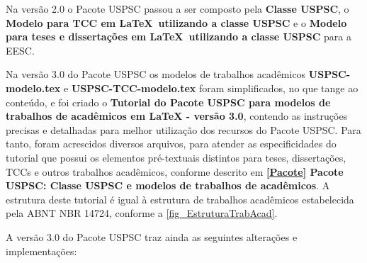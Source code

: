 Na versão 2.0 o Pacote USPSC passou a ser composto pela \textbf{Classe USPSC}, o \textbf{Modelo para TCC em \LaTeX\ utilizando a classe USPSC} e o \textbf{Modelo para teses e dissertações em \LaTeX\ utilizando a classe USPSC} para a EESC.

Na versão 3.0 do Pacote USPSC os modelos de trabalhos acadêmicos \textbf{USPSC-modelo.tex} e \textbf{USPSC-TCC-modelo.tex} foram simplificados, no que tange ao conteúdo, e foi criado o \textbf{Tutorial do Pacote USPSC para modelos de trabalhos de acad\^emicos em LaTeX - vers\~ao 3.0}, contendo as instruções precisas e detalhadas para melhor utilização dos recursos do Pacote USPSC. Para tanto, foram acrescidos diversos arquivos, para atender as especificidades do tutorial que possui os elementos pré-textuais distintos para teses, dissertações, TCCs e outros trabalhos acadêmicos, conforme descrito em  \textbf{\ref{Pacote} Pacote USPSC: Classe USPSC e modelos de trabalhos de acadêmicos}. A estrutura deste tutorial é igual à  estrutura de trabalhos acadêmicos estabelecida pela ABNT NBR 14724, conforme a \autoref{fig_EstruturaTrabAcad}.		

A versão 3.0 do Pacote USPSC traz ainda as seguintes alterações e implementações:

